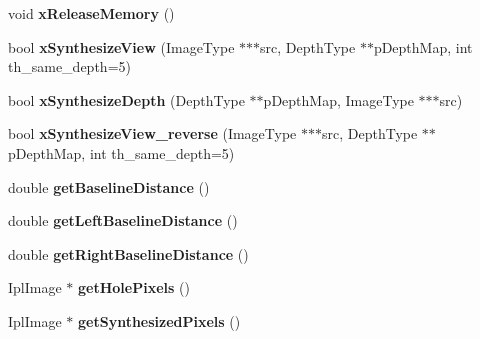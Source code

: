 \begin{DoxyCompactItemize}
void {\bfseries x\+Release\+Memory} ()
\item 
\mbox{\label{class_c_view_interpolation_general_a55f6c03b268945c749634ab02545354f}} 
bool {\bfseries x\+Synthesize\+View} (Image\+Type $\ast$$\ast$$\ast$src, Depth\+Type $\ast$$\ast$p\+Depth\+Map, int th\+\_\+same\+\_\+depth=5)
\item 
\mbox{\label{class_c_view_interpolation_general_a7e84e0cf597a4d62b2f1184fdc6ffa1b}} 
bool {\bfseries x\+Synthesize\+Depth} (Depth\+Type $\ast$$\ast$p\+Depth\+Map, Image\+Type $\ast$$\ast$$\ast$src)
\item 
\mbox{\label{class_c_view_interpolation_general_a456e136da71f52a4388dfa1651f230c3}} 
bool {\bfseries x\+Synthesize\+View\+\_\+reverse} (Image\+Type $\ast$$\ast$$\ast$src, Depth\+Type $\ast$$\ast$p\+Depth\+Map, int th\+\_\+same\+\_\+depth=5)
\item 
\mbox{\label{class_c_view_interpolation_general_a8bca6ac0df6d7a259ea30a860dec65be}} 
double {\bfseries get\+Baseline\+Distance} ()
\item 
\mbox{\label{class_c_view_interpolation_general_a4d2ec9e20e3ce4adb018a8bdecde3bd2}} 
double {\bfseries get\+Left\+Baseline\+Distance} ()
\item 
\mbox{\label{class_c_view_interpolation_general_a38acaa635137e2ca3b5f3a4d0ebc5c0e}} 
double {\bfseries get\+Right\+Baseline\+Distance} ()
\item 
\mbox{\label{class_c_view_interpolation_general_a41518d98029eb37e8eef8bd0172db005}} 
Ipl\+Image $\ast$ {\bfseries get\+Hole\+Pixels} ()
\item 
\mbox{\label{class_c_view_interpolation_general_a2d553c8a258958a0272b35f1c73c1b70}} 
Ipl\+Image $\ast$ {\bfseries get\+Synthesized\+Pixels} ()
\item 
\mbox{\label{class_c_view_interpolation_general_a652bbd413459273aab58eedf948289ed}} 
$$
\end{DoxyCompactItemize}

